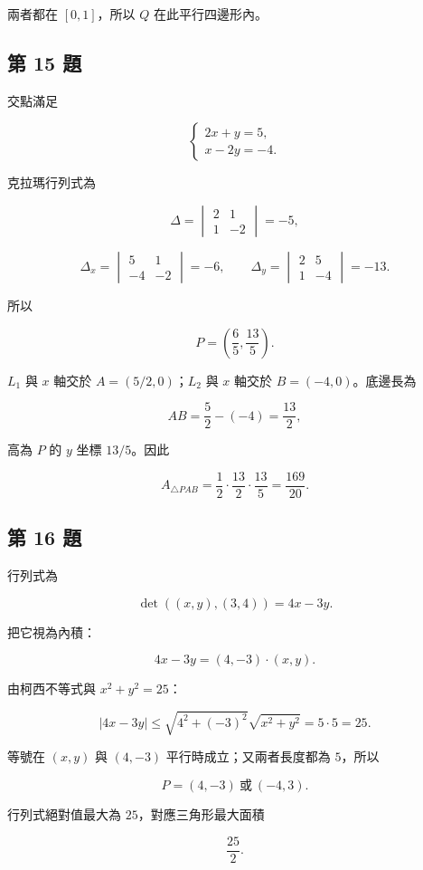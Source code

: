 \documentclass[11pt,a4paper]{article}
\begin{document}
兩者都在 \([0,1]\)，所以 \(Q\) 在此平行四邊形內。

\subsection{第 15 題}\label{ux7b2c-15-ux984c}

交點滿足

\[
\begin{cases}
2x+y=5,\\
x-2y=-4.
\end{cases}
\]

克拉瑪行列式為

\[
\Delta=
\begin{vmatrix}2&1\\1&-2\end{vmatrix}=-5,
\]

\[
\Delta_x=
\begin{vmatrix}5&1\\-4&-2\end{vmatrix}=-6,
\qquad
\Delta_y=
\begin{vmatrix}2&5\\1&-4\end{vmatrix}=-13.
\]

所以

\[
P=\boxed{\left(\frac65,\frac{13}{5}\right)}.
\]

\(L_1\) 與 \(x\) 軸交於 \(A=(5/2,0)\)；\(L_2\) 與 \(x\) 軸交於 \(B=(-4,0)\)。底邊長為

\[
AB=\frac52-(-4)=\frac{13}{2},
\]

高為 \(P\) 的 \(y\) 坐標 \(13/5\)。因此

\[
A_{\triangle PAB}
=\frac12\cdot\frac{13}{2}\cdot\frac{13}{5}
=\boxed{\frac{169}{20}}.
\]

\subsection{第 16 題}\label{ux7b2c-16-ux984c}

行列式為

\[
\det((x,y),(3,4))=4x-3y.
\]

把它視為內積：

\[
4x-3y=(4,-3)\cdot(x,y).
\]

由柯西不等式與 \(x^2+y^2=25\)：

\[
|4x-3y|
\le\sqrt{4^2+(-3)^2}\sqrt{x^2+y^2}
=5\cdot5=25.
\]

等號在 \((x,y)\) 與 \((4,-3)\) 平行時成立；又兩者長度都為 \(5\)，所以

\[
\boxed{P=(4,-3)\ \text{或}\ (-4,3)}.
\]

行列式絕對值最大為 \(\boxed{25}\)，對應三角形最大面積

\[
\boxed{\frac{25}{2}}.
\]
\end{document}
